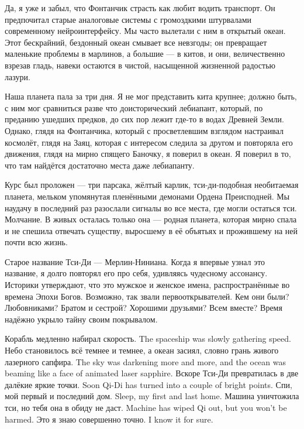 Да, я уже и забыл, что Фонтанчик страсть как любит водить транспорт.
Он предпочитал старые аналоговые системы с громоздкими штурвалами современному нейроинтерфейсу.
Мы часто вылетали с ним в открытый океан.
Этот бескрайний, бездонный океан смывает все невзгоды;
он превращает маленькие проблемы в марлинов, а большие --- в китов, и они, величественно взрезав гладь, навеки остаются в чистой, насыщенной жизненной радостью лазури.

Наша планета пала за три дня.
Я не мог представить кита крупнее;
должно быть, с ним мог сравниться разве что доисторический лебиапант, который, по преданию ушедших предков, до сих пор лежит где-то в водах Древней Земли.
Однако, глядя на Фонтанчика, который с просветлевшим взглядом настраивал космолёт, глядя на Заяц, которая с интересом следила за другом и повторяла его движения, глядя на мирно спящего Баночку, я поверил в океан.
Я поверил в то, что там найдётся достаточно места даже лебиапанту.

Курс был проложен --- три парсака, жёлтый карлик, тси-ди-подобная необитаемая планета, мельком упомянутая пленёнными демонами Ордена Преисподней.
Мы наудачу в последний раз разослали сигналы во все места, где могли остаться тси.
Молчание.
В живых осталась только она --- родная планета, которая мирно спала и не спешила отвечать существу, выросшему в её объятьях и прожившему на ней почти всю жизнь.

Старое название Тси-Ди --- Мерлин-Ниниана.
Когда я впервые узнал это название, я долго повторял его про себя, удивляясь чудесному ассонансу.
Историки утверждают, что это мужское и женское имена, распространённые во времена Эпохи Богов.
Возможно, так звали первооткрывателей.
Кем они были?
Любовниками?
Братом и сестрой?
Хорошими друзьями?
Всем вместе?
Время надёжно укрыло тайну своим покрывалом.

{Корабль медленно набирал скорость.}
{The spaceship was slowly gathering speed.}
{Небо становилось всё темнее и темнее, а океан засиял, словно грань живого лазерного сапфира.}
{The sky was darkening more and more, and the ocean was beaming like a face of animated laser sapphire.}
{Вскоре Тси-Ди превратилась в две далёкие яркие точки.}
{Soon Qi-Di has turned into a couple of bright points.}
{Спи, мой первый и последний дом.}
{Sleep, my first and last home.}
{Машина уничтожила тси, но тебя она в обиду не даст.}
{Machine has wiped Qi out, but you won't be harmed.}
{Это я знаю совершенно точно.}
{I know it for sure.}


